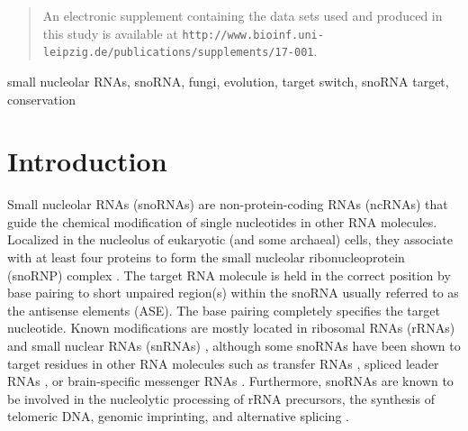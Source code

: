 \documentclass[preprint,3p,times,twocolumn]{elsarticle}
\newcommand{\url}[1]{\texttt{\small #1}}
\newcommand{\sno}{snoRNA}
\begin{document}
\begin{frontmatter}
\begin{abstract}
  An electronic supplement containing the data sets used and produced in
  this study is available at
  \url{http://www.bioinf.uni-leipzig.de/publications/supplements/17-001}. 
\end{abstract}

\begin{keyword}
  small nucleolar RNAs, snoRNA, fungi, evolution, target switch, snoRNA target, 	
  conservation	
\end{keyword}

\end{frontmatter}


\section{Introduction}

Small nucleolar RNAs (snoRNAs) are non-protein-coding RNAs (ncRNAs) that
guide the chemical modification of single nucleotides in other RNA
molecules.  Localized in the nucleolus of eukaryotic (and some archaeal)
cells, they associate with at least four proteins to form the small
nucleolar ribonucleoprotein (snoRNP) complex \cite{Reichow:2007}.  The
target RNA molecule is held in the correct position by base pairing to
short unpaired region(s) within the snoRNA usually referred to as the
antisense elements (ASE). The base pairing completely specifies the target
nucleotide. Known modifications are mostly located in ribosomal RNAs
(rRNAs) and small nuclear RNAs (snRNAs)
\cite{Decatur:2002,Darzacq:2002,Bratkovi:2011}, although some snoRNAs have
been shown to target residues in other RNA molecules such as transfer RNAs
\cite{Clouet_d'Orval:2001,Dennis:2001}, spliced leader RNAs
\cite{Uliel:2004}, or brain-specific messenger RNAs \cite{Cavaillé:2000,
  Kishore:2006}. Furthermore, {\sno}s are known to be involved in the
nucleolytic processing of rRNA precursors, the synthesis of telomeric DNA,
genomic imprinting, and alternative splicing
\cite{Maxwell:1995,Tollervey:1997,Kiss:2002,Matera:2007}.
\end{document}
